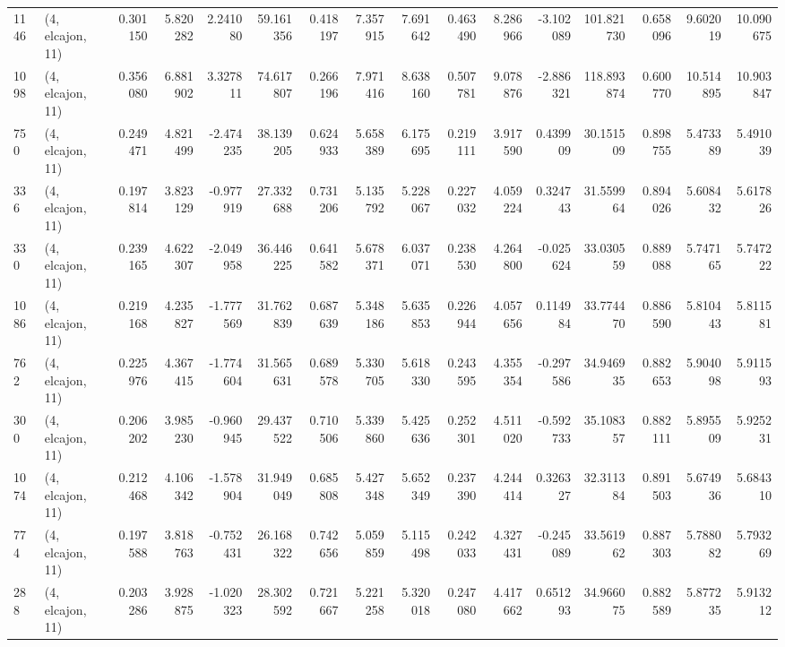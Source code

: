 \begin{tabular}{llrrrrrrrrrrrrrr}
1146 &  (4, elcajon, 11) &   0.301150 &   5.820282 &   2.241080 &     59.161356 &    0.418197 &    7.357915 &    7.691642 &  0.463490 &   8.286966 &  -3.102089 &   101.821730 &   0.658096 &   9.602019 &  10.090675 \\
1098 &  (4, elcajon, 11) &   0.356080 &   6.881902 &   3.327811 &     74.617807 &    0.266196 &    7.971416 &    8.638160 &  0.507781 &   9.078876 &  -2.886321 &   118.893874 &   0.600770 &  10.514895 &  10.903847 \\
750  &  (4, elcajon, 11) &   0.249471 &   4.821499 &  -2.474235 &     38.139205 &    0.624933 &    5.658389 &    6.175695 &  0.219111 &   3.917590 &   0.439909 &    30.151509 &   0.898755 &   5.473389 &   5.491039 \\
336  &  (4, elcajon, 11) &   0.197814 &   3.823129 &  -0.977919 &     27.332688 &    0.731206 &    5.135792 &    5.228067 &  0.227032 &   4.059224 &   0.324743 &    31.559964 &   0.894026 &   5.608432 &   5.617826 \\
330  &  (4, elcajon, 11) &   0.239165 &   4.622307 &  -2.049958 &     36.446225 &    0.641582 &    5.678371 &    6.037071 &  0.238530 &   4.264800 &  -0.025624 &    33.030559 &   0.889088 &   5.747165 &   5.747222 \\
1086 &  (4, elcajon, 11) &   0.219168 &   4.235827 &  -1.777569 &     31.762839 &    0.687639 &    5.348186 &    5.635853 &  0.226944 &   4.057656 &   0.114984 &    33.774470 &   0.886590 &   5.810443 &   5.811581 \\
762  &  (4, elcajon, 11) &   0.225976 &   4.367415 &  -1.774604 &     31.565631 &    0.689578 &    5.330705 &    5.618330 &  0.243595 &   4.355354 &  -0.297586 &    34.946935 &   0.882653 &   5.904098 &   5.911593 \\
300  &  (4, elcajon, 11) &   0.206202 &   3.985230 &  -0.960945 &     29.437522 &    0.710506 &    5.339860 &    5.425636 &  0.252301 &   4.511020 &  -0.592733 &    35.108357 &   0.882111 &   5.895509 &   5.925231 \\
1074 &  (4, elcajon, 11) &   0.212468 &   4.106342 &  -1.578904 &     31.949049 &    0.685808 &    5.427348 &    5.652349 &  0.237390 &   4.244414 &   0.326327 &    32.311384 &   0.891503 &   5.674936 &   5.684310 \\
774  &  (4, elcajon, 11) &   0.197588 &   3.818763 &  -0.752431 &     26.168322 &    0.742656 &    5.059859 &    5.115498 &  0.242033 &   4.327431 &  -0.245089 &    33.561962 &   0.887303 &   5.788082 &   5.793269 \\
288  &  (4, elcajon, 11) &   0.203286 &   3.928875 &  -1.020323 &     28.302592 &    0.721667 &    5.221258 &    5.320018 &  0.247080 &   4.417662 &   0.651293 &    34.966075 &   0.882589 &   5.877235 &   5.913212 \\

\end{tabular}
